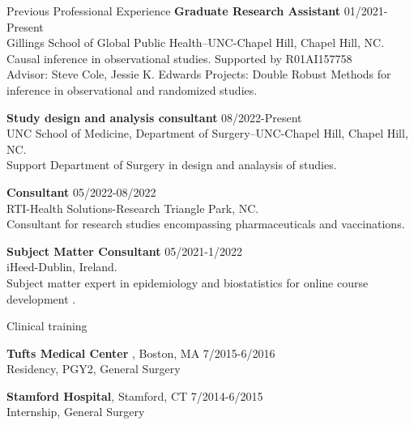 \documentclass{resume} %
\begin{document}
   
\begin{rSection}{Previous Professional Experience}
   {\textbf{Graduate Research Assistant}} \hfill {01/2021-Present}
   \\ 
   Gillings School of Global Public Health--UNC-Chapel Hill, Chapel Hill, NC. 
   \\
   Causal inference in observational studies. Supported by R01AI157758\\
   Advisor: Steve Cole, Jessie K. Edwards
   Projects: Double Robust Methods for inference in observational and randomized studies. 
   

   {\textbf{Study design and analysis consultant}} \hfill {08/2022-Present}
   \\ 
   UNC School of Medicine, Department of Surgery--UNC-Chapel Hill, Chapel Hill, NC. 
   \\
   Support Department of Surgery in design and analaysis of studies.

   {\textbf{Consultant} } \hfill {05/2022-08/2022}
   \\
   RTI-Health Solutions-Research Triangle Park, NC. 
   \\
   Consultant for research studies encompassing pharmaceuticals and vaccinations.

   {\textbf{Subject Matter Consultant}} \hfill {05/2021-1/2022}
   \\
   iHeed-Dublin, Ireland. 
   \\
   Subject matter expert in epidemiology and biostatistics for online course development .
   
   \end{rSection}


\begin{rSection}{Clinical training}

   {\textbf{Tufts Medical Center} }{, Boston, MA} \hfill {7/2015-6/2016}
   \\ 
   Residency, PGY2, General Surgery
   
   {\textbf{Stamford Hospital}}{, Stamford, CT} \hfill {7/2014-6/2015}
   \\ 
   Internship, General Surgery
   \end{rSection}
\end{document}
